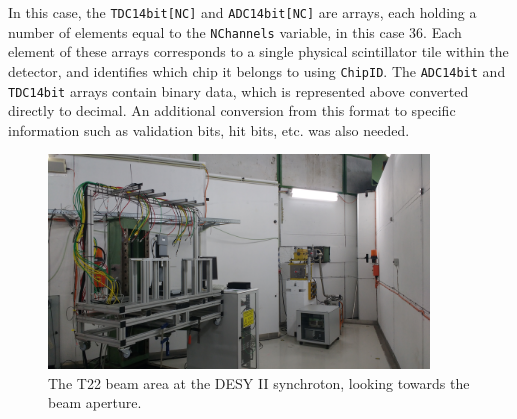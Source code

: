 %
%

In this case, the \texttt{TDC14bit[NC]} and \texttt{ADC14bit[NC]} are arrays, each holding a number of elements equal to the \texttt{NChannels} variable, in this case 36. Each element of these arrays corresponds to a single physical scintillator tile within the detector, and identifies which chip it belongs to using \texttt{ChipID}. The \texttt{ADC14bit} and \texttt{TDC14bit} arrays contain binary data, which is represented above converted directly to decimal. An additional conversion from this format to specific information such as validation bits, hit bits, etc. was also needed.


\begin{figure}[p]
	\centering
	\includegraphics[width=0.9\textwidth]{../Pictures/AHCAL-DESY-2016-Beam.jpg}
	\caption{The T22 beam area at the DESY II synchroton, looking towards the beam aperture.}
	\label{figure:aida/may2016/beamarea}
\end{figure}

